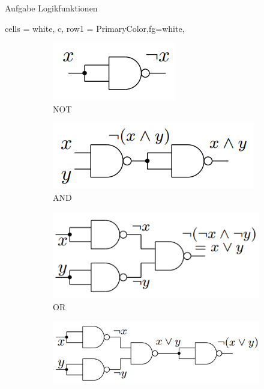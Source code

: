 \begin{frame}[allowframebreaks]{Aufgabe \thesection}{Logikfunktionen}
\begin{solution}
{\begin{minipage}[t]{30cm}
\begin{table}
\begin{tblr}{
            cells = {white, c},
            row{1} = {PrimaryColor,fg=white},
          }
          \end{tblr}
        \end{table}
      \end{minipage}
    }
  \end{solution}
  \begin{solutionnoinc}
    \begin{figure}
      \begin{subfigure}{0.3\linewidth}
        \includegraphics[width=0.6\linewidth, center]{./figures/not.png}
        \caption{NOT}
      \end{subfigure}
      \begin{subfigure}{0.3\linewidth}
        \includegraphics[width=0.9\linewidth, center]{./figures/and.png}
        \caption{AND}
      \end{subfigure}
      \begin{subfigure}{0.3\linewidth}
        \includegraphics[width=\linewidth, center]{./figures/or.png}
        \caption{OR}
      \end{subfigure}
      \begin{subfigure}{0.3\linewidth}
        \includegraphics[width=\linewidth, center]{./figures/nor.png}

\end{subfigure}
\end{figure}
\end{solutionnoinc}
\end{frame}
